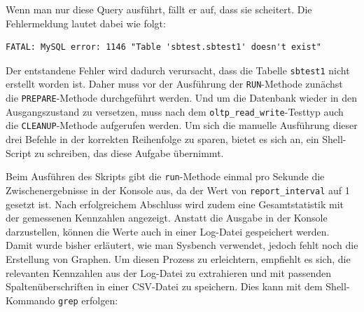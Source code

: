 Wenn man nur diese Query ausführt, fällt er auf, dass sie scheitert.
Die Fehlermeldung lautet dabei wie folgt:

\begin{lstlisting}[style=custom_daniel,label={lst:tools-error-without-prepare}]
FATAL: MySQL error: 1146 "Table 'sbtest.sbtest1' doesn't exist"
\end{lstlisting}

Der entstandene Fehler wird dadurch verursacht, dass die Tabelle \texttt{sbtest1} nicht erstellt worden ist.
Daher muss vor der Ausführung der \texttt{RUN}-Methode zunächst die \texttt{PREPARE}-Methode durchgeführt werden.
Und um die Datenbank wieder in den Ausgangszustand zu versetzen, muss nach dem \texttt{oltp\_read\_write}-Testtyp auch die \texttt{CLEANUP}-Methode aufgerufen werden.
Um sich die manuelle Ausführung dieser drei Befehle in der korrekten Reihenfolge zu sparen, bietet es sich an, ein Shell-Script zu schreiben, das diese Aufgabe übernimmt.

\vspace{-5pt}

\vspace{-5pt}

Beim Ausführen des Skripts gibt die \texttt{run}-Methode einmal pro Sekunde die Zwischenergebnisse in der Konsole aus, da der Wert von \texttt{report\_interval} auf 1 gesetzt ist.
Nach erfolgreichem Abschluss wird zudem eine Gesamtstatistik mit der gemessenen Kennzahlen angezeigt.
Anstatt die Ausgabe in der Konsole darzustellen, können die Werte auch in einer Log-Datei gespeichert werden.
Damit wurde bisher erläutert, wie man Sysbench verwendet, jedoch fehlt noch die Erstellung von Graphen.
Um diesen Prozess zu erleichtern, empfiehlt es sich, die relevanten Kennzahlen aus der Log-Datei zu extrahieren und mit passenden Spaltenüberschriften in einer CSV-Datei zu speichern.
Dies kann mit dem Shell-Kommando \texttt{grep} erfolgen:

\vspace{-5pt}

\vspace{-5pt}


